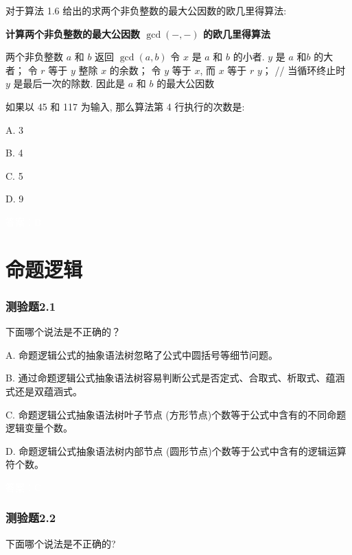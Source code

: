 \documentclass[UTF8, heading=true]{ctexart}
\begin{document}
对于算法 1.6 给出的求两个非负整数的最大公因数的欧几里得算法:

\begin{algorithm}
  \caption{\textbf{计算两个非负整数的最大公因数 $\operatorname{gcd}(-,-)$ 的欧几里得算法}}
  \begin{algorithmic}[1]
    \Require 两个非负整数 $a$ 和 $b$
    \Ensure 返回 $\operatorname{gcd}(a, b)$
    \State 令 $x$ 是 $a$ 和 $b$ 的小者. $y$ 是 $a$ 和$b$ 的大者；
    \State 令 $r$ 等于 $y$ 整除 $x$ 的余数；
    \State 令 $y$ 等于 $x$, 而 $x$ 等于 $r$
    \EndWhile
    \State \Return $y$； // 当循环终止时 $y$ 是最后一次的除数. 因此是 $a$ 和 $b$ 的最大公因数
  \end{algorithmic}
\end{algorithm}

如果以 45 和 117 为输入, 那么算法第 4 行执行的次数是: $\qquad$

A. 3

B. 4

C. 5

D. 9

\textcolor{white}{答案：B}

\clearpage

\section{命题逻辑}

\subsubsection{测验题2.1}

下面哪个说法是不正确的？

A. 命题逻辑公式的抽象语法树忽略了公式中圆括号等细节问题。

B. 通过命题逻辑公式抽象语法树容易判断公式是否定式、合取式、析取式、蕴涵式还是双蕴涵式。

C. 命题逻辑公式抽象语法树叶子节点 (方形节点)个数等于公式中含有的不同命题逻辑变量个数。

D. 命题逻辑公式抽象语法树内部节点 (圆形节点)个数等于公式中含有的逻辑运算符个数。

\textcolor{white}{答案：C}

\subsubsection{测验题2.2}

下面哪个说法是不正确的?
\end{document}
